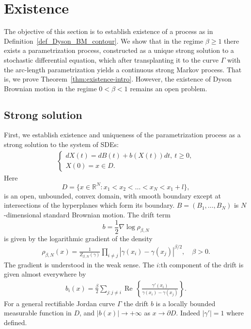 \documentclass[11pt]{article}
\renewcommand{\Re}{\operatorname{Re}\,}
\numberwithin{equation}{section}
\theoremstyle{definition}
\begin{document}
\section{Existence}\label{sec::existence}
The objective of this section is to establish existence of a process as in Definition~\ref{def_Dyson_BM_contour}. We show that in the regime $\beta\ge 1$ there exists a parametrization process, constructed as a unique strong solution to a stochastic differential equation, which after transplanting it to the curve $\Gamma$ with the arc-length parametrization yields a continuous strong Markov process. That is, we prove Theorem~\ref{thm:existence-intro}. However, the existence of Dyson Brownian motion in the regime $0<\beta<1$ remains an open problem.  

\subsection{Strong solution}
First, we establish existence and uniqueness of the parametrization process as a strong solution to the system of SDEs:
\begin{align}\label{eq::SDE_parametrization_process_X}
\begin{cases}
    dX(t) = dB(t)+b(X(t))dt, \ t\ge0,\\
    X(0)=x\in D.
\end{cases}
\end{align}
Here
\[
D = \{x\in\mathbb{R}^{N}: x_{1}<x_{2}<\dots<x_{N}<x_{1}+l\},
\]
 is an open, unbounded, convex domain, with smooth boundary except at intersections of the hyperplanes which form its boundary.
$B=(B_{1},\dots,B_{N})$ is $N$-dimensional standard Brownian motion. The drift term  \[b = \frac{1}{2}\nabla\log\rho_{\beta,N}\] is given by the logarithmic gradient of the density
\begin{align*}
    \rho_{\beta,N}(x) = \frac{1}{Z_{\beta, N}(\gamma)}\prod_{i\neq j}|\gamma(x_{i})-\gamma(x_{j})|^{\beta/2}, \quad \beta>0.
\end{align*}
The gradient is understood in the weak sense. The $i$:th component of the drift is given almost everywhere by 
\begin{align*}
b_{i}(x) = \frac{\beta}{2}\sum\limits_{j:j\neq i}\Re\left\{\frac{\gamma'(x_{i})}{\gamma(x_{i})-\gamma(x_{j})}\right\}.
\end{align*}
 For a general rectifiable Jordan curve $\Gamma$ the drift $b$ is a locally bounded measurable function in $ D$, and $|b(x)|\to+\infty$ as $x\to\partial D$. Indeed $|\gamma'| = 1$ where defined.
\end{document}
